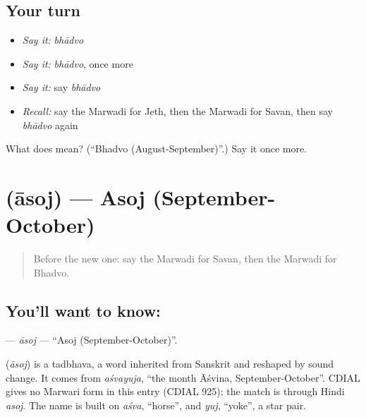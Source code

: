\subsection*{Your turn}
\begin{itemize}
\raggedright
  \item \emph{Say it:} \emph{bhādvo}
  \item \emph{Say it:} \emph{bhādvo}, once more
  \item \emph{Say it:} say \emph{bhādvo}
  \item \emph{Recall:} say the Marwadi for Jeth, then the Marwadi for Savan, then say \emph{bhādvo} again
\end{itemize}

\begin{tcolorbox}[breakable,colback=teal!4,colframe=teal!35!black,title={Before you move on}]
What does  mean? (\textquotedblleft{}Bhadvo (August-September)\textquotedblright{}.) Say it once more.
\end{tcolorbox}
\section[\texorpdfstring{\mw{आसोज} (āsoj)}{आसोज (āsoj)}]{ (āsoj) — Asoj (September-October)}

\label{lesson:MW-C93-asoj}



\begin{quote}
Before the new one: say the Marwadi for Savan, then the Marwadi for Bhadvo.
\end{quote}

\subsection*{You'll want to know: }
\textbf{} — \emph{āsoj} — \textquotedblleft{}Asoj (September-October)\textquotedblright{}.

\begin{cousinweb}
\textbf{} (\emph{āsoj}) is a tadbhava, a word inherited from Sanskrit and reshaped by sound change. It comes from \emph{aśvayuja}, \textquotedblleft{}the month Āśvina, September-October\textquotedblright{}. CDIAL gives no Marwari form in this entry (CDIAL 925); the match is through Hindi \emph{asoj}. The name is built on \emph{aśva}, \textquotedblleft{}horse\textquotedblright{}, and \emph{yuj}, \textquotedblleft{}yoke\textquotedblright{}, a star pair.
\end{cousinweb}

